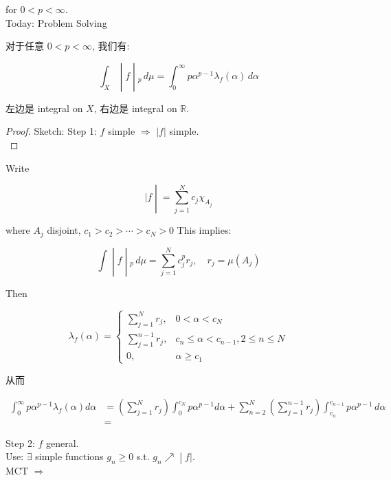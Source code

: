 \documentclass{qlnotes-export}
\begin{document}
for \(0 < p < \infty\).\\
Today: Problem Solving

\begin{proposition}\label{prop-lec36-problem-solving-proposition-001}

对于任意 \(0 < p < \infty\), 我们有:

\[\left. \int_{X} \middle| f \middle| {}_{p}\, d\mu = \int_{0}^{\infty}p\alpha^{p - 1}\lambda_{f}(\alpha)\, d\alpha \right.\]

\end{proposition}

左边是 integral on \(X\), 右边是 integral on \(\mathbb{R}\).

\begin{proof}

Sketch: Step 1: \(f\) simple \(\Longrightarrow\) \(|f|\) simple.\\

\end{proof}

Write

\[\left. |f \middle| = \sum\limits_{j = 1}^{N}c_{j}\chi_{A_{j}} \right.\]

where \(A_{j}\) disjoint, \(c_{1} > c_{2} > \cdots > c_{N} > 0\) This implies:

\[\left. \int \middle| f \middle| {}_{p}\, d\mu = \sum\limits_{j = 1}^{N}c_{j}^{p}r_{j},\quad r_{j} = \mu(A_{j}) \right.\]

Then

\[\lambda_{f}(\alpha) = \left\{ \begin{matrix}
{\sum_{j = 1}^{N}r_{j},} & {0 < \alpha < c_{N}} \\
{\sum_{j = 1}^{n - 1}r_{j},} & {c_{n} \leq \alpha < c_{n - 1},2 \leq n \leq N} \\
{0,} & {\alpha \geq c_{1}}
\end{matrix} \right.\]

从而

\[\begin{matrix}
{\int_{0}^{\infty}p\alpha^{p - 1}\lambda_{f}(\alpha)d\alpha} & {= (\sum\limits_{j = 1}^{N}r_{j})\int_{0}^{c_{N}}p\alpha^{p - 1}d\alpha + \sum\limits_{n = 2}^{N}(\sum\limits_{j = 1}^{n - 1}r_{j})\int_{c_{n}}^{c_{n - 1}}p\alpha^{p - 1}\, d\alpha} \\
 & =
\end{matrix}\]

Step 2: \(f\) general.\\
Use: \(\exists\) simple functions \(g_{n} \geq 0\) s.t. \(\left. g_{n}\operatorname{\nearrow ︎} \middle| f| \right.\).\\
MCT \(\Longrightarrow\)
\end{document}
